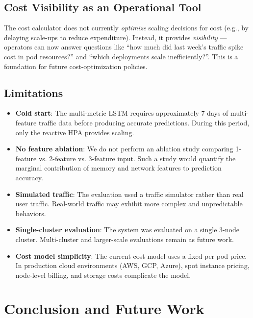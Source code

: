 \documentclass[journal]{IEEEtran}
\begin{document}
\subsection{Cost Visibility as an Operational Tool}
The cost calculator does not currently \textit{optimize} scaling decisions for cost (e.g., by delaying scale-ups to reduce expenditure). Instead, it provides \textit{visibility} --- operators can now answer questions like ``how much did last week's traffic spike cost in pod resources?'' and ``which deployments scale inefficiently?''. This is a foundation for future cost-optimization policies.

\subsection{Limitations}
\begin{itemize}
    \item \textbf{Cold start}: The multi-metric LSTM requires approximately 7 days of multi-feature traffic data before producing accurate predictions. During this period, only the reactive HPA provides scaling.
    \item \textbf{No feature ablation}: We do not perform an ablation study comparing 1-feature vs. 2-feature vs. 3-feature input. Such a study would quantify the marginal contribution of memory and network features to prediction accuracy.
    \item \textbf{Simulated traffic}: The evaluation used a traffic simulator rather than real user traffic. Real-world traffic may exhibit more complex and unpredictable behaviors.
    \item \textbf{Single-cluster evaluation}: The system was evaluated on a single 3-node cluster. Multi-cluster and larger-scale evaluations remain as future work.
    \item \textbf{Cost model simplicity}: The current cost model uses a fixed per-pod price. In production cloud environments (AWS, GCP, Azure), spot instance pricing, node-level billing, and storage costs complicate the model.
\end{itemize}

\section{Conclusion and Future Work}
\label{sec:conclusion}
\end{document}
